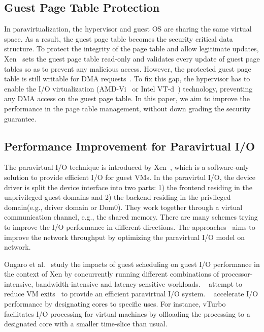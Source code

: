 \subsection{Guest Page Table Protection} 
In paravirtualization, the hypervisor and guest OS are sharing the same virtual space.
As a result, the guest page table becomes the security critical data structure.
To protect the integrity of the page table and allow legitimate updates, Xen~\cite{barham2003xen} sets the guest page table read-only and validates every update of guest page tables so as to prevent any malicious access. 
However, the protected guest page table is still writable for DMA requests~\cite{disaggregation}. 
To fix this gap, the hypervisor has to enable the I/O virtualization (AMD-Vi~\cite{amdvt} or Intel VT-d~\cite{intelvt}) technology, preventing any DMA access on the guest page table.
In this paper, we aim to improve the performance in the page table management, without down grading the security guarantee.

\subsection{Performance Improvement for Paravirtual I/O} 
The paravirtual I/O technique is introduced by Xen~\cite{barham2003xen}, which is a software-only solution to provide efficient I/O for guest VMs. 
In the paravirtul I/O, the device driver is split the device interface into two parts: 1) the frontend residing in the unprivileged guest domains and 2) the backend residing in the privileged domain(e.g., driver domain or Dom0). They work together through a virtual communication channel, e.g., the shared memory.
There are many schemes trying to improve the I/O performance in different directions.
The approaches~\cite{menon2006optimizing,4734994,santos2008bridging} aims to improve the network throughput by optimizing the paravirtual I/O model on network.

Ongaro et al.~\cite{ongaro2008scheduling} study the impacts of guest scheduling on guest I/O performance in the context of Xen by concurrently running different combinations of processor-intensive, bandwidth-intensive and latency-sensitive workloads. ~\cite{gordon2012towards,har2013efficient} attempt to reduce VM exits~\cite{adams2006comparison} to provide an efficient paravirtual I/O system. ~\cite{liao2008software,liu2009virtualization,shalev2010isostack,landau2011splitx,xu2013vturbo} accelerate I/O performance by  designating cores to specific uses. For instance, vTurbo~\cite{xu2013vturbo} facilitates I/O processing for virtual machines by offloading the processing to a designated core with a smaller time-slice than usual.

